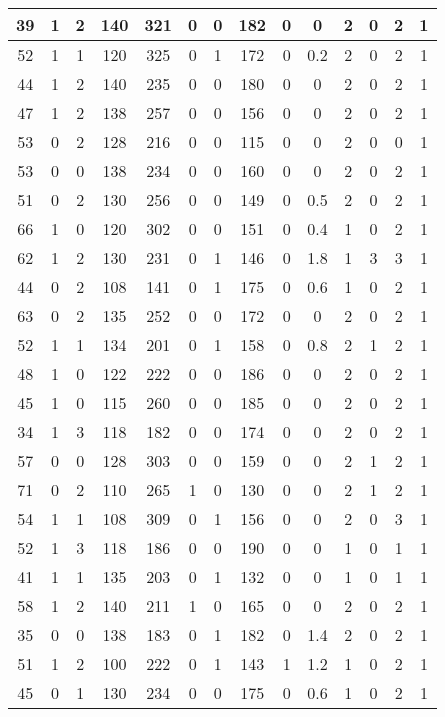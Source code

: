 \documentclass{article}
\begin{document}
\begin{longtable}{|c|c|c|c|c|c|c|c|c|c|c|c|c|c|}
\hline
39 & 1 & 2 & 140 & 321 & 0 & 0 & 182 & 0 & 0 & 2 & 0 & 2 & 1\\
\hline
52 & 1 & 1 & 120 & 325 & 0 & 1 & 172 & 0 & 0.2 & 2 & 0 & 2 & 1\\
\hline
44 & 1 & 2 & 140 & 235 & 0 & 0 & 180 & 0 & 0 & 2 & 0 & 2 & 1\\
\hline
47 & 1 & 2 & 138 & 257 & 0 & 0 & 156 & 0 & 0 & 2 & 0 & 2 & 1\\
\hline
53 & 0 & 2 & 128 & 216 & 0 & 0 & 115 & 0 & 0 & 2 & 0 & 0 & 1\\
\hline
53 & 0 & 0 & 138 & 234 & 0 & 0 & 160 & 0 & 0 & 2 & 0 & 2 & 1\\
\hline
51 & 0 & 2 & 130 & 256 & 0 & 0 & 149 & 0 & 0.5 & 2 & 0 & 2 & 1\\
\hline
66 & 1 & 0 & 120 & 302 & 0 & 0 & 151 & 0 & 0.4 & 1 & 0 & 2 & 1\\
\hline
62 & 1 & 2 & 130 & 231 & 0 & 1 & 146 & 0 & 1.8 & 1 & 3 & 3 & 1\\
\hline
44 & 0 & 2 & 108 & 141 & 0 & 1 & 175 & 0 & 0.6 & 1 & 0 & 2 & 1\\
\hline
63 & 0 & 2 & 135 & 252 & 0 & 0 & 172 & 0 & 0 & 2 & 0 & 2 & 1\\
\hline
52 & 1 & 1 & 134 & 201 & 0 & 1 & 158 & 0 & 0.8 & 2 & 1 & 2 & 1\\
\hline
48 & 1 & 0 & 122 & 222 & 0 & 0 & 186 & 0 & 0 & 2 & 0 & 2 & 1\\
\hline
45 & 1 & 0 & 115 & 260 & 0 & 0 & 185 & 0 & 0 & 2 & 0 & 2 & 1\\
\hline
34 & 1 & 3 & 118 & 182 & 0 & 0 & 174 & 0 & 0 & 2 & 0 & 2 & 1\\
\hline
57 & 0 & 0 & 128 & 303 & 0 & 0 & 159 & 0 & 0 & 2 & 1 & 2 & 1\\
\hline
71 & 0 & 2 & 110 & 265 & 1 & 0 & 130 & 0 & 0 & 2 & 1 & 2 & 1\\
\hline
54 & 1 & 1 & 108 & 309 & 0 & 1 & 156 & 0 & 0 & 2 & 0 & 3 & 1\\
\hline
52 & 1 & 3 & 118 & 186 & 0 & 0 & 190 & 0 & 0 & 1 & 0 & 1 & 1\\
\hline
41 & 1 & 1 & 135 & 203 & 0 & 1 & 132 & 0 & 0 & 1 & 0 & 1 & 1\\
\hline
58 & 1 & 2 & 140 & 211 & 1 & 0 & 165 & 0 & 0 & 2 & 0 & 2 & 1\\
\hline
35 & 0 & 0 & 138 & 183 & 0 & 1 & 182 & 0 & 1.4 & 2 & 0 & 2 & 1\\
\hline
51 & 1 & 2 & 100 & 222 & 0 & 1 & 143 & 1 & 1.2 & 1 & 0 & 2 & 1\\
\hline
45 & 0 & 1 & 130 & 234 & 0 & 0 & 175 & 0 & 0.6 & 1 & 0 & 2 & 1\\

\end{longtable}
\end{document}
